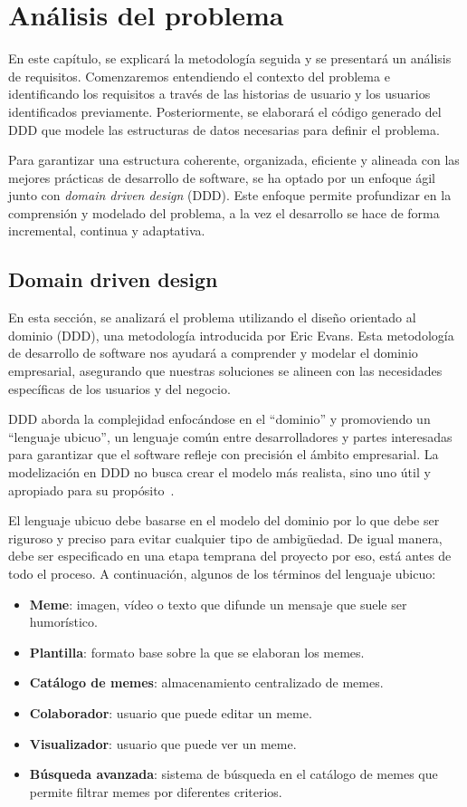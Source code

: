 \chapter{Análisis del problema}

En este capítulo, se explicará la metodología seguida y se presentará un análisis de requisitos. Comenzaremos entendiendo el contexto del problema e identificando los requisitos a través de las historias de usuario y los usuarios identificados previamente. Posteriormente, se elaborará el código generado del DDD que modele las estructuras de datos necesarias para definir el problema.

Para garantizar una estructura coherente, organizada, eficiente y alineada con las mejores prácticas de desarrollo de software, se ha optado por un enfoque ágil junto con \textit{domain driven design} (DDD). Este enfoque permite profundizar en la comprensión y modelado del problema, a la vez el desarrollo se hace de forma incremental, continua y adaptativa.

\section{Domain driven design}

En esta sección, se analizará el problema utilizando el diseño orientado al dominio (DDD), una metodología introducida por Eric Evans. Esta metodología de desarrollo de software nos ayudará a comprender y modelar el dominio empresarial, asegurando que nuestras soluciones se alineen con las necesidades específicas de los usuarios y del negocio.

DDD aborda la complejidad enfocándose en el ``dominio'' y promoviendo un ``lenguaje ubicuo'', un lenguaje común entre desarrolladores y partes interesadas para garantizar que el software refleje con precisión el ámbito empresarial. La modelización en DDD no busca crear el modelo más realista, sino uno útil y apropiado para su propósito~\cite{evans2004domain}.

El lenguaje ubicuo debe basarse en el modelo del dominio por lo que debe ser riguroso y preciso para evitar cualquier tipo de ambigüedad. De igual manera, debe ser especificado en una etapa temprana del proyecto por eso, está antes de todo el proceso. A continuación, algunos de los términos del lenguaje ubicuo:

\begin{itemize}
    \item \textbf{Meme}: imagen, vídeo o texto que difunde un mensaje que suele ser humorístico.
    \item \textbf{Plantilla}: formato base sobre la que se elaboran los memes.
    \item \textbf{Catálogo de memes}: almacenamiento centralizado de memes.
    \item \textbf{Colaborador}: usuario que puede editar un meme.
    \item \textbf{Visualizador}: usuario que puede ver un meme.
    \item \textbf{Búsqueda avanzada}: sistema de búsqueda en el catálogo de memes que permite filtrar memes por diferentes criterios.
\end{itemize}

